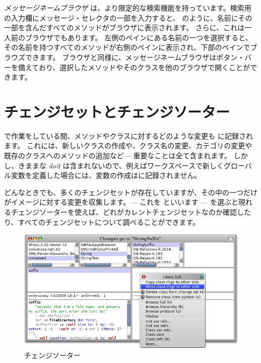 \documentclass[a4paper,10pt,twoside]{book}
\begin{document}
\emph{メッセージネームブラウザ} は、より限定的な検索機能を持っています。検索用の入力欄にメッセージ・セレクタの一部を入力すると、 のように、名前にその一部を含んだすべてのメソッドがブラウザに表示されます。
さらに、これは一人前のブラウザでもあります。
左側のペインにある名前の一つを選択すると、その名前を持つすべてのメソッドが右側のペインに表示され、下部のペインでブラウズできます。
ブラウザと同様に、メッセージネームブラウザはボタン・バーを備えており、選択したメソッドやそのクラスを他のブラウザで開くことができます。



\section{チェンジセットとチェンジソーター}

\pharo で作業をしている間、メソッドやクラスに対するどのような変更も  に記録されます。
これには、新しいクラスの作成や、クラス名の変更、カテゴリの変更や既存のクラスへのメソッドの追加など\,---\,重要なことは全て含まれます。
しかし、きままな \emph{doit} は含まれないので、例えばワークスペースで新しくグローバル変数を定義した場合には、変数の作成はに記録されません。

どんなときでも、多くのチェンジセットが存在していますが、その中の一つだけがイメージに対する変更を収集します。\,---\,これを  といいます\,---\,
を選ぶと現れるチェンジソーターを使えば、どれがカレントチェンジセットなのか確認したり、すべてのチェンジセットについて調べることができます。

\begin{figure}[btp]
\begin{center}
\includegraphics[width=\linewidth]{changeSorter}
\end{center}
\caption{チェンジソーター}
\end{figure}
\end{document}
